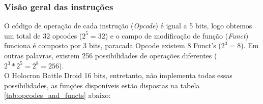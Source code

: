 \documentclass{article}
\newcommand\tab[1][0.50cm]{\hspace*{#1}}
\begin{document}
			\subsubsection{Vis\~{a}o geral das instru\c{c}\~{o}es}
				\tab O c\'{o}digo de opera\c{c}\~{a}o de cada instru\c{c}\~{a}o (\textit{Opcode}) \'{e} igual a 5 bits, logo obtemos um total de 32 opcodes ($2^{5} = 32$) e o campo de modifica\c{c}\~{a}o de fun\c{c}\~{a}o (\textit{Funct}) funciona \'{e} composto por 3 bits, paracada Opcode existem 8 Funct's ($2^{3} = 8$). Em outras palavras, existem 256 possibilidades de opera\c{c}\~{o}es diferentes ($2^{3} * 2^{5} = 2^{8} = 256$).\\
				\tab O Holocron Battle Droid 16 bits, entretanto, n\~{a}o implementa todas essas possibilidades, as fun\c{c}\~{o}es dispon\'{i}veis est\~{a}o dispostas na tabela \ref{tab:opcodes_and_functs} abaixo:
\end{document}
